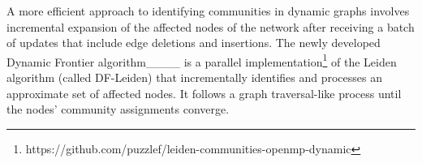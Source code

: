 

A more efficient approach to identifying communities in dynamic graphs involves incremental expansion of the affected nodes of the network after receiving a batch of updates that include edge deletions and insertions. The newly developed Dynamic Frontier algorithm____ is a parallel implementation\footnote{https://github.com/puzzlef/leiden-communities-openmp-dynamic} of the Leiden algorithm (called DF-Leiden) that incrementally identifies and processes an approximate set of affected nodes. It follows a graph traversal-like process until the nodes' community assignments converge.


